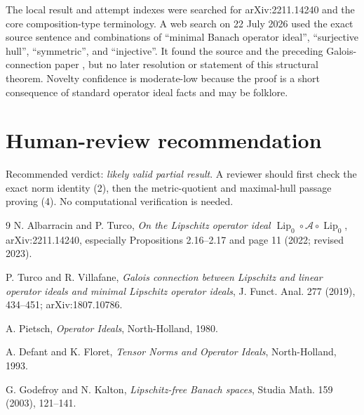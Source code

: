\documentclass[11pt]{article}
\begin{document}
The local result and attempt indexes were searched for arXiv:2211.14240 and
the core composition-type terminology. A web search on 22 July 2026 used the
exact source sentence and combinations of ``minimal Banach operator ideal'',
``surjective hull'', ``symmetric'', and ``injective''. It found the source
\cite{AT} and the preceding Galois-connection paper \cite{TV}, but no later
resolution or statement of this structural theorem. Novelty confidence is
moderate-low because the proof is a short consequence of standard operator
ideal facts and may be folklore.

\section{Human-review recommendation}

Recommended verdict: \emph{likely valid partial result}. A reviewer should
first check the exact norm identity (2), then the metric-quotient and
maximal-hull passage proving (4). No computational verification is needed.

\begin{thebibliography}{9}
N. Albarracin and P. Turco,
\emph{On the Lipschitz operator ideal $\operatorname{Lip}_0\circ\mathcal A
\circ\operatorname{Lip}_0$}, arXiv:2211.14240, especially Propositions
2.16--2.17 and page 11 (2022; revised 2023).

P. Turco and R. Villafane,
\emph{Galois connection between Lipschitz and linear operator ideals and
minimal Lipschitz operator ideals}, J. Funct. Anal. 277 (2019), 434--451;
arXiv:1807.10786.

A. Pietsch, \emph{Operator Ideals}, North-Holland, 1980.

A. Defant and K. Floret, \emph{Tensor Norms and Operator Ideals},
North-Holland, 1993.

G. Godefroy and N. Kalton, \emph{Lipschitz-free Banach spaces},
Studia Math. 159 (2003), 121--141.
\end{thebibliography}
\end{document}
